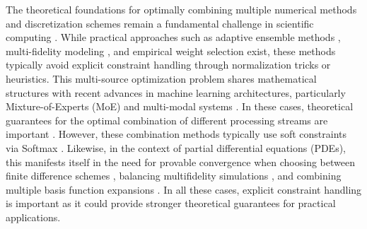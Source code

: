 \documentclass[preprint,12pt,authoryear]{elsarticle}
\begin{document}
The theoretical foundations for optimally combining multiple numerical methods and discretization schemes remain a fundamental challenge in scientific computing \cite{liu2023unified, wang2023theoretical}. While practical approaches such as adaptive ensemble methods \textcolor{blue}{\cite{dietterich2000ensemble}}, multi-fidelity modeling \cite{peherstorfer2023survey}, and empirical weight selection \cite{wang2023empirical} exist, these methods typically avoid explicit constraint handling through normalization tricks or heuristics. This multi-source optimization problem shares mathematical structures with recent advances in machine learning architectures, particularly Mixture-of-Experts (MoE) \cite{fedus2022switch} and multi-modal systems \cite{alayrac2022flamingo}. In these cases, theoretical guarantees for the optimal combination of different processing streams are important \cite{zhou2022mixture, dai2023theoretically}. However, these combination methods typically use soft constraints via Softmax \cite{shazeer2022glu, hazimeh2021dselect}. Likewise, in the context of partial differential equations (PDEs), this manifests itself in the need for provable convergence when choosing between finite difference schemes \cite{leveque2007finite}, balancing multifidelity simulations \cite{cai2023multifidelity}, and combining multiple basis function expansions \cite{shen2022spectral}. In all these cases, explicit constraint handling is important as it could provide stronger theoretical guarantees for practical applications.
\end{document}
